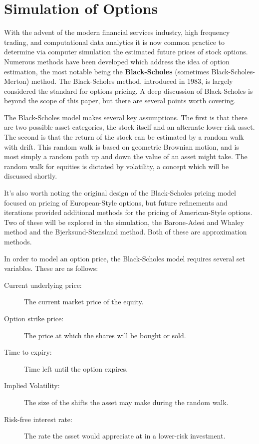 \section{Simulation of Options}

With the advent of the modern financial services industry, high frequency trading, and computational data analytics it is now common practice to determine via computer simulation the estimated future prices of stock options. Numerous methods have been developed which address the idea of option estimation, the most notable being the \textbf{Black-Scholes} (sometimes Black-Scholes-Merton) method. The Black-Scholes method, introduced in 1983, is largely considered the standard for options pricing. A deep discussion of Black-Scholes is beyond the scope of this paper, but there are several points worth covering. 

The Black-Scholes model makes several key assumptions. The first is that there are two possible asset categories, the stock itself and an alternate lower-risk asset. The second is that the return of the stock can be estimated by a random walk with drift. This random walk is based on geometric Brownian motion, and is most simply a random path up and down the value of an asset might take. The random walk for equities is dictated by volatility, a concept which will be discussed shortly. 

It's also worth noting the original design of the Black-Scholes pricing model focused on pricing of European-Style options, but future refinements and iterations provided additional methods for the pricing of American-Style options. Two of these will be explored in the simulation, the Barone-Adesi and Whaley method and the Bjerksund-Stensland method. Both of these are approximation methods.

In order to model an option price, the Black-Scholes model requires several set variables. These are as follows:

\begin{description}
\item[Current underlying price:] The current market price of the equity.
\item[Option strike price:] The price at which the shares will be bought or sold.
\item[Time to expiry:] Time left until the option expires.
\item[Implied Volatility:] The size of the shifts the asset may make during the random walk.
\item[Risk-free interest rate:] The rate the asset would appreciate at in a lower-risk investment.
\end{description}

